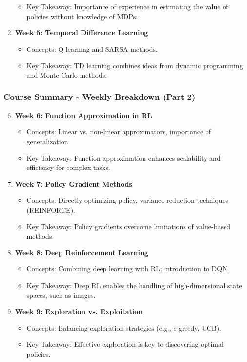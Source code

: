 \documentclass[aspectratio=169]{beamer}
\begin{document}
\begin{frame}[fragile]
\begin{enumerate}
\begin{itemize}
                \item Key Takeaway: Importance of experience in estimating the value of policies without knowledge of MDPs.
            \end{itemize}
        \item \textbf{Week 5: Temporal Difference Learning}
            \begin{itemize}
                \item Concepts: Q-learning and SARSA methods.
                \item Key Takeaway: TD learning combines ideas from dynamic programming and Monte Carlo methods.
            \end{itemize}
    \end{enumerate}
\end{frame}

\begin{frame}[fragile]
    \frametitle{Course Summary - Weekly Breakdown (Part 2)}
    \begin{enumerate}
        \setcounter{enumi}{5}
        \item \textbf{Week 6: Function Approximation in RL}
            \begin{itemize}
                \item Concepts: Linear vs. non-linear approximators, importance of generalization.
                \item Key Takeaway: Function approximation enhances scalability and efficiency for complex tasks.
            \end{itemize}
        \item \textbf{Week 7: Policy Gradient Methods}
            \begin{itemize}
                \item Concepts: Directly optimizing policy, variance reduction techniques (REINFORCE).
                \item Key Takeaway: Policy gradients overcome limitations of value-based methods.
            \end{itemize}
        \item \textbf{Week 8: Deep Reinforcement Learning}
            \begin{itemize}
                \item Concepts: Combining deep learning with RL; introduction to DQN.
                \item Key Takeaway: Deep RL enables the handling of high-dimensional state spaces, such as images.
            \end{itemize}
        \item \textbf{Week 9: Exploration vs. Exploitation}
            \begin{itemize}
                \item Concepts: Balancing exploration strategies (e.g., $\epsilon$-greedy, UCB).
                \item Key Takeaway: Effective exploration is key to discovering optimal policies.
            \end{itemize}
    \end{enumerate}
\end{frame}
\end{document}
